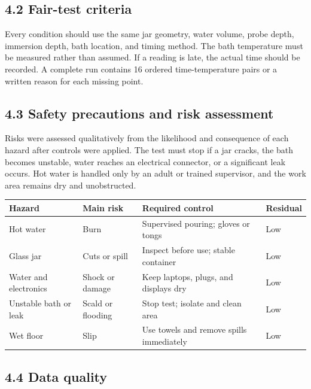 \documentclass[10pt,conference,a4paper]{IEEEtran}
\begin{document}
\subsection*{4.2 Fair-test criteria}

Every condition should use the same jar geometry, water volume, probe depth, immersion depth, bath location, and timing method. The bath temperature must be measured rather than assumed. If a reading is late, the actual time should be recorded. A complete run contains 16 ordered time-temperature pairs or a written reason for each missing point.

\subsection*{4.3 Safety precautions and risk assessment}

Risks were assessed qualitatively from the likelihood and consequence of each hazard after controls were applied. The test must stop if a jar cracks, the bath becomes unstable, water reaches an electrical connector, or a significant leak occurs. Hot water is handled only by an adult or trained supervisor, and the work area remains dry and unobstructed.

\begin{center}\footnotesize
\setlength{\tabcolsep}{2.5pt}
\renewcommand{\arraystretch}{1.14}
\begin{tabular}{>{\raggedright\arraybackslash}p{}>{\raggedright\arraybackslash}p{}>{\raggedright\arraybackslash}p{}>{\centering\arraybackslash}p{}}
\toprule
\textbf{Hazard} & \textbf{Main risk} & \textbf{Required control} & \textbf{Residual} \\
\midrule
Hot water & Burn & Supervised pouring; gloves or tongs & Low \\
Glass jar & Cuts or spill & Inspect before use; stable container & Low \\
Water and electronics & Shock or damage & Keep laptops, plugs, and displays dry & Low \\
Unstable bath or leak & Scald or flooding & Stop test; isolate and clean area & Low \\
Wet floor & Slip & Use towels and remove spills immediately & Low \\
\bottomrule
\end{tabular}
\end{center}

\subsection*{4.4 Data quality}
\end{document}
